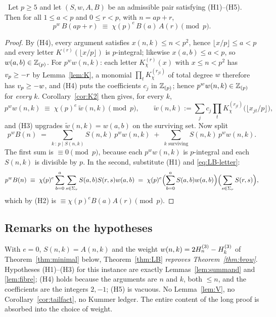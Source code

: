 \begin{theorem}[Theorem LB]\label{thm:LB}
\Proved\ Let $p\ge5$ and let $(S,w,A,B)$ be an admissible pair satisfying
\textup{(H1)--(H5)}. Then for all $1\le a<p$ and $0\le r<p$, with $n=ap+r$,
\[
   p^{w}\,B(ap+r)\;\equiv\;\chi(p)^{e}\,B(a)\,A(r)\pmod p .
\]
\end{theorem}

\begin{proof}
By (H4), every argument satisfies $x(n,k)\le n<p^2$, hence $\lfloor x/p\rfloor\le a<p$ and
every letter $K^{(r)}(\lfloor x/p\rfloor)$ is $p$-integral; likewise $x(a,b)\le a<p$, so
$w(a,b)\in\mathbb{Z}_{(p)}$. For $p^ww(n,k)$: each letter $K^{(r)}_\chi(x)$ with $x\le n<p^2$ has
$v_p\ge-r$ by Lemma~\ref{lem:K}, a monomial $\prod_tK^{(r_{jt})}_\chi$ of total degree $w$
therefore has $v_p\ge-w$, and (H4) puts the coefficients $c_j$ in $\mathbb{Z}_{(p)}$; hence
$p^ww(n,k)\in\mathbb{Z}_{(p)}$ for \emph{every} $k$.
Corollary~\ref{cor:K2} then gives, for every $k$,
\begin{equation}\label{eq:LB-letter}
   p^{w}w(n,k)\;\equiv\;\chi(p)^{e}\,\widetilde w(n,k)\pmod p,
   \qquad
   \widetilde w(n,k):=\sum_jc_j\prod_tK^{(r_{jt})}_{\chi}\bigl(\lfloor x_{jt}/p\rfloor\bigr),
\end{equation}
and (H3) upgrades $\widetilde w(n,k)=w(a,b)$ on the surviving set. Now split
\[
   p^{w}B(n)\;=\;\sum_{k\,:\,p\mid S(n,k)}S(n,k)\,p^{w}w(n,k)
   \;+\;\sum_{k\text{ surviving}}S(n,k)\,p^{w}w(n,k).
\]
The first sum is $\equiv0\pmod p$, because each $p^ww(n,k)$ is $p$-integral and each
$S(n,k)$ is divisible by $p$. In the second, substitute (H1) and
\eqref{eq:LB-letter}:
\[
   p^{w}B(n)\;\equiv\;\chi(p)^{e}\sum_{b=0}^{a}\sum_{s\in\Sigma_r}S(a,b)S(r,s)w(a,b)
   \;=\;\chi(p)^{e}\Bigl(\sum_{b=0}^{a}S(a,b)w(a,b)\Bigr)\Bigl(\sum_{s\in\Sigma_r}S(r,s)\Bigr),
\]
which by (H2) is $\equiv\chi(p)^{e}B(a)A(r)\pmod p$.
\end{proof}

\subsection{Remarks on the hypotheses}

\begin{remark}\label{rem:threeLines}
With $e=0$, $S(n,k)=A(n,k)$ and the weight $w(n,k)=2H^{(3)}_{n}-H^{(3)}_{k}$ of
Theorem~\ref{thm:minimal} below, Theorem~\ref{thm:LB} \emph{reproves
Theorem~\ref{thm:brow}}. Hypotheses (H1)--(H3) for this instance are exactly
Lemmas~\ref{lem:summand} and \ref{lem:fibre}; (H4) holds because the arguments are $n$ and
$k$, both $\le n$, and the coefficients are the integers $2,-1$; (H5) is vacuous. No
Lemma~\ref{lem:V}, no Corollary~\ref{cor:tailfact}, no Kummer ledger. The entire content
of the long proof is absorbed into the choice of weight.
\end{remark}

